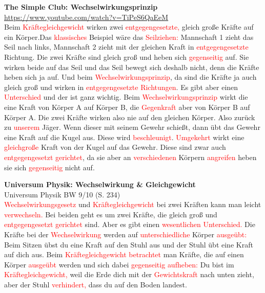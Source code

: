 \documentclass[
	aspectratio=169, %
	8pt, %
]{beamer}
\begin{document}
\begin{frame}
	\begin{mycolumns}
		\textbf{The Simple Club: Wechselwirkungsprinzip} \\ {\tiny \href{https://www.youtube.com/watch?v=TiPeS6QaEeM}{https://www.youtube.com/watch?v=TiPeS6QaEeM}} \\[1em]
{\footnotesize 
Beim \textcolor{red}{Kräftegleichgewicht} wirken zwei \textcolor{red}{entgegengesetzte,} gleich große Kräfte auf ein Körper.Das \textcolor{red}{klassisches} Beispiel wäre das \textcolor{red}{Seilziehen:} Mannschaft 1 zieht das Seil nach links, Mannschaft 2 zieht mit der gleichen Kraft in \textcolor{red}{entgegengesetzte} Richtung. Die zwei Kräfte sind gleich groß und heben sich \textcolor{red}{gegenseitig} auf. Sie wirken beide auf das Seil und das Seil bewegt sich deshalb nicht, denn die Kräfte heben sich ja auf. Und beim \textcolor{red}{Wechselwirkungsprinzip}, da sind die Kräfte ja auch gleich groß und wirken in \textcolor{red}{entgegengesetzte} \textcolor{red}{Richtungen}. Es gibt aber einen \textcolor{red}{Unterschied} und der ist ganz wichtig. Beim \textcolor{red}{Wechselwirkungsprinzip} wirkt die eine Kraft von Körper A auf Körper B, die \textcolor{red}{Gegenkraft} aber von Körper B auf Körper A. Die zwei Kräfte wirken also nie auf den gleichen Körper. Also zurück zu \textcolor{red}{unserem} Jäger. Wenn dieser mit seinem Gewehr schießt, dann übt das Gewehr eine Kraft auf die Kugel aus. Diese wird \textcolor{red}{beschleunigt}. \textcolor{red}{Umgekehrt} wirkt eine \textcolor{red}{gleichgroße} Kraft von der Kugel auf das Gewehr. Diese sind zwar auch \textcolor{red}{entgegengesetzt} \textcolor{red}{gerichtet}, da sie aber an \textcolor{red}{verschiedenen} Körpern \textcolor{red}{angreifen} heben sie sich \textcolor{red}{gegenseitig} nicht auf.
}



		\mynextcolumn
		\textbf{Universum Physik: Wechselwirkung \& Gleichgewicht} \\
		{\tiny Universum Physik BW 9/10 (S. 234)}\\[1em]
{\footnotesize 
\textcolor{red}{Wechselwirkungsgesetz} und \textcolor{red}{Kräftegleichgewicht} bei zwei Kräften kann man leicht \textcolor{red}{verwechseln.} Bei beiden geht es um zwei Kräfte, die gleich groß und \textcolor{red}{entgegengesetzt} \textcolor{red}{gerichtet} sind. Aber es gibt einen \textcolor{red}{wesentlichen} \textcolor{red}{Unterschied.} Die Kräfte bei der \textcolor{red}{Wechselwirkung} werden auf \textcolor{red}{unterschiedliche} Körper \textcolor{red}{ausgeübt:} Beim Sitzen übst du eine Kraft auf den Stuhl aus und der Stuhl übt eine Kraft auf dich aus. Beim \textcolor{red}{Kräftegleichgewicht} \textcolor{red}{betrachtet} man Kräfte, die auf einen Körper \textcolor{red}{ausgeübt} werden und sich dabei \textcolor{red}{gegenseitig} \textcolor{red}{aufheben:} Du bist im \textcolor{red}{Kräftegleichgewicht,} weil die Erde dich mit der \textcolor{red}{Gewichtskraft} nach unten zieht, aber der Stuhl \textcolor{red}{verhindert,} dass du auf den Boden landest.}\\[7em] \




\end{mycolumns}
\end{frame}
\end{document}
